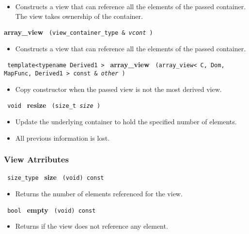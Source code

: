 \begin{itemize}
\item
Constructs a view that can reference all the elements of the passed container. The view takes ownership of the container.
\end{itemize}

\noindent
\textbf{array\_view}%
\texttt{%
(view\_container\_type \&
\textit{vcont}%
)
}

\begin{itemize}
\item
Constructs a view that can reference all the elements of the passed container.
\end{itemize}

\noindent
\texttt{%
template<typename Derived1 >
}
\newline
\textbf{array\_view}%
\texttt{%
(array\_view< C, Dom, MapFunc, Derived1 > const \&
\textit{other}%
)
}

\begin{itemize}
\item
Copy constructor when the passed view is not the most derived view.
\end{itemize}

\noindent
\texttt{%
void
}
\newline
\textbf{resize}%
\texttt{%
(size\_t
\textit{size}%
)
}

\begin{itemize}
\item
Update the underlying container to hold the specified number of elements.
\item
All previous information is lost.
\end{itemize}

\subsubsection{View Atrributes}

\noindent
\texttt{%
size\_type
}
\newline
\textbf{size}%
\texttt{%
(void) const
}

\begin{itemize}
\item
Returns the number of elements referenced for the view.
\end{itemize}

\noindent
\texttt{%
bool
}
\newline
\textbf{empty}%
\texttt{%
(void) const
}

\begin{itemize}
\item
Returns if the view does not reference any element.
\end{itemize}

